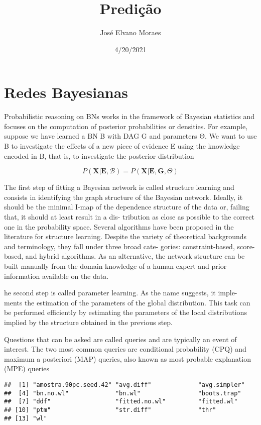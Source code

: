 \documentclass[
]{article}
\title{Predição}
\author{José Elvano Moraes}
\date{4/20/2021}
\begin{document}
\maketitle

\hypertarget{redes-bayesianas}{%
\section{Redes Bayesianas}\label{redes-bayesianas}}

Probabilistic reasoning on BNs works in the framework of Bayesian
statistics and focuses on the computation of posterior probabilities or
densities. For example, suppose we have learned a BN B with DAG G and
parameters Θ. We want to use B to investigate the effects of a new piece
of evidence E using the knowledge encoded in B, that is, to investigate
the posterior distribution

\[P(\mathbf{X} | \mathbf{E},\mathbf{\mathcal{B}})=P(\mathbf{X} | \mathbf{E},\mathbf{G},\Theta)\]

The first step of fitting a Bayesian network is called structure
learning and consists in identifying the graph structure of the Bayesian
network. Ideally, it should be the minimal I-map of the dependence
structure of the data or, failing that, it should at least result in a
dis- tribution as close as possible to the correct one in the
probability space. Several algorithms have been proposed in the
literature for structure learning. Despite the variety of theoretical
backgrounds and terminology, they fall under three broad cate- gories:
constraint-based, score-based, and hybrid algorithms. As an alternative,
the network structure can be built manually from the domain knowledge of
a human expert and prior information available on the data.

he second step is called parameter learning. As the name suggests, it
imple- ments the estimation of the parameters of the global
distribution. This task can be performed efficiently by estimating the
parameters of the local distributions implied by the structure obtained
in the previous step.

Questions that can be asked are called queries and are typically an
event of interest. The two most common queries are conditional
probability (CPQ) and maximum a posteriori (MAP) queries, also known as
most probable explanation (MPE) queries

\begin{verbatim}
##  [1] "amostra.90pc.seed.42" "avg.diff"             "avg.simpler"         
##  [4] "bn.no.wl"             "bn.wl"                "boots.trap"          
##  [7] "ddf"                  "fitted.no.wl"         "fitted.wl"           
## [10] "ptm"                  "str.diff"             "thr"                 
## [13] "wl"
\end{verbatim}
\end{document}
